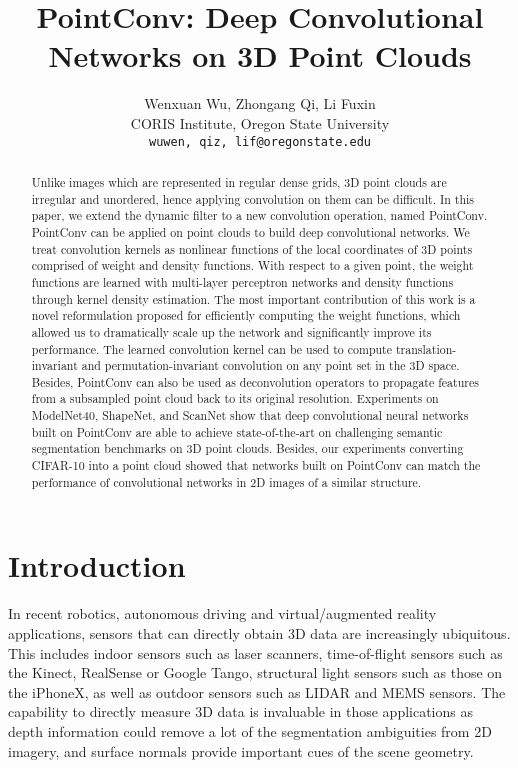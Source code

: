 \documentclass[10pt,twocolumn,letterpaper]{article}
\begin{document}
\title{PointConv: Deep Convolutional Networks on 3D Point Clouds}

\author{Wenxuan Wu, Zhongang Qi, Li Fuxin\\
CORIS Institute, Oregon State University\\
{\tt\small wuwen, qiz, lif@oregonstate.edu}
}

\maketitle


\begin{abstract}
Unlike images which are represented in regular dense grids, 3D point clouds are irregular and unordered, hence applying convolution on them can be difficult. In this paper, we extend the dynamic filter to a new convolution operation, named PointConv. PointConv can be applied on point clouds to build deep convolutional networks. We treat convolution kernels as nonlinear functions of the local coordinates of 3D points comprised of weight and density functions. With respect to a given point, the weight functions are learned with multi-layer perceptron networks and density functions through kernel density estimation. The most important contribution of this work is a novel reformulation proposed for efficiently computing the weight functions, which allowed us to dramatically scale up the network and significantly improve its performance. The learned convolution kernel can be used to compute translation-invariant and permutation-invariant convolution on any point set in the 3D space. 
Besides, PointConv can also be used as deconvolution operators to propagate features from a subsampled point cloud back to its original resolution. Experiments on ModelNet40, ShapeNet, and ScanNet show that deep convolutional neural networks built on PointConv are able to achieve state-of-the-art on challenging semantic segmentation benchmarks on 3D point clouds. Besides, our experiments converting CIFAR-10 into a point cloud showed that networks built on PointConv can match the performance of convolutional networks in 2D images of a similar structure.
\end{abstract}

\vspace{-0.2in}
\section{Introduction}

In recent robotics, autonomous driving and virtual/augmented reality applications, sensors that can directly obtain 3D data are increasingly ubiquitous. This includes indoor sensors such as laser scanners, time-of-flight sensors such as the Kinect, RealSense or Google Tango, structural light sensors such as those on the iPhoneX, as well as outdoor sensors such as LIDAR and MEMS sensors. The capability to directly measure 3D data is invaluable in those applications as depth information could remove a lot of the segmentation ambiguities from 2D imagery, and surface normals provide important cues of the scene geometry. 
\end{document}
